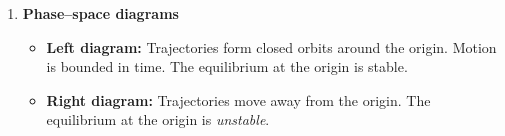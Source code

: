 \documentclass[12pt]{article}
\begin{document}
\begin{enumerate}
Interpretation:

\begin{itemize}
    \item The total mechanical energy of a lightly damped oscillator decays exponentially in time.
    \item The decay rate is set by $\omega_0/Q$. Large $Q$ means slow energy loss (weak damping); small $Q$ means fast energy loss (strong damping).
    \item Over a timescale $\Delta t \sim Q/\omega_0$, the energy drops by a factor of $1/e$. This timescale is often called the ``ringdown time''.
\end{itemize}



\item \textbf{Phase--space diagrams}

\begin{itemize}
\item \textbf{Left diagram:} Trajectories form closed orbits around the origin. Motion is bounded in time. The equilibrium at the origin is stable.
\item \textbf{Right diagram:} Trajectories move away from the origin. The equilibrium at the origin is \emph{unstable}.
\end{itemize}
\end{enumerate}
\end{document}
